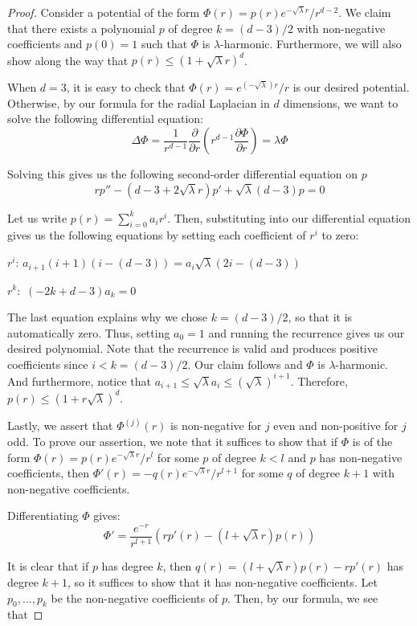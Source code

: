 \begin{proof}
Consider a potential of the form $\Phi(r) = p(r)e^{-\sqrt{\lambda}r}/r^{d-2}$. We claim that there exists a polynomial $p$ of degree $k = (d-3)/2$ with non-negative coefficients and $p(0) = 1$ such that $\Phi$ is $\lambda$-harmonic. Furthermore, we will also show along the way that $p(r) \leq (1+\sqrt{\lambda}r)^d$.

When $d = 3$, it is easy to check that $\Phi(r) = e^{(-\sqrt{\lambda})r}/r$ is our desired potential. Otherwise, by our formula for the radial Laplacian in $d$ dimensions, we want to solve the following differential equation:
%
\[\Delta \Phi =  \frac{1}{r^{d-1}} \frac{\partial}{\partial r} (r^{d-1} \frac{\partial \Phi}{\partial r}) =\lambda \Phi\]

Solving this gives us the following second-order differential equation on $p$
%
\[rp'' - (d-3+2\sqrt{\lambda}r)p' +\sqrt{\lambda} (d-3)p = 0\]

Let us write $p(r) = \sum_{i=0}^k a_i r^i$. Then, substituting into our differential equation gives us the following equations by setting each coefficient of $r^i$ to zero:

$r^i$:  $a_{i+1}(i+1)(i - (d-3)) = a_i \sqrt{\lambda} (2i-(d-3))$

$r^k:$ $(-2k +d-3)a_k = 0$

The last equation explains why we chose $k = (d-3)/2$, so that it is automatically zero. Thus, setting $a_0 = 1$ and running the recurrence gives us our desired polynomial. Note that the recurrence is valid and produces positive coefficients since $i < k  = (d-3)/2$. Our claim follows and $\Phi$ is $\lambda$-harmonic. And furthermore, notice that $a_{i+1} \leq \sqrt{\lambda} a_i \leq (\sqrt{\lambda})^{i+1}$. Therefore, $p(r) \leq (1+r\sqrt{\lambda})^d$. 

Lastly, we assert that $\Phi^{(j)}(r)$ is non-negative for $j$ even and non-positive for $j$ odd. To prove our assertion, we note that it suffices to show that if $\Phi$ is of the form $\Phi(r) = p(r) e^{-\sqrt{\lambda}r}/r^{l}$ for some $p$ of degree $k < l$ and $p$ has non-negative coefficients, then $\Phi'(r) = - q(r) e^{-\sqrt{\lambda}r}/r^{l+1}$ for some $q$ of degree $k+1$ with non-negative coefficients. 

Differentiating $\Phi$ gives:
%
\[\Phi' = \frac{e^{-r}}{r^{l+1}} (rp'(r) - (l + \sqrt{\lambda} r)p(r))\]

It is clear that if $p$ has degree $k$, then $q(r) = (l+\sqrt{\lambda} r)p(r) - rp'(r)$ has degree $k+1$, so it suffices to show that it has non-negative coefficients. Let $p_0,..., p_k$ be the non-negative coefficients of $p$. Then, by our formula, we see that 


\end{proof}
